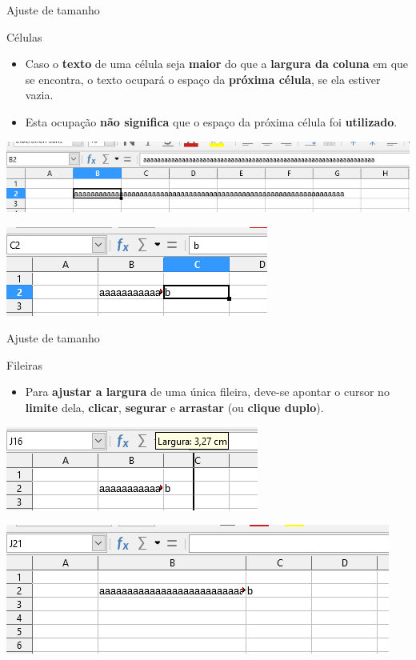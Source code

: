 \begin{frame}{Ajuste de tamanho}
	\begin{block}{Células}
		\begin{itemize}
			\item Caso o \textbf{texto} de uma célula seja \textbf{maior} do que a \textbf{largura da coluna} em que se encontra, o texto ocupará o espaço da \textbf{próxima célula}, se ela estiver vazia.
			\item Esta ocupação \textbf{não significa} que o espaço da próxima célula foi \textbf{utilizado}.
		\end{itemize}
	\end{block}
	
	\centering
	\includegraphics[width=0.7\linewidth]{Figuras/Ch06/fig19}
	
	\bigskip
	
	\includegraphics[width=0.5\linewidth]{Figuras/Ch06/fig20}
\end{frame}


\begin{frame}{Ajuste de tamanho}
	\begin{block}{Fileiras}
		\begin{itemize}
			\item Para \textbf{ajustar a largura} de uma única fileira, deve-se apontar o cursor no \textbf{limite} dela, \textbf{clicar}, \textbf{segurar} e \textbf{arrastar} (ou \textbf{clique duplo}).
		\end{itemize}
	\end{block}
	
	\centering
	\includegraphics[width=0.5\linewidth]{Figuras/Ch06/fig21}
	
	\bigskip
	
	\includegraphics[width=0.7\linewidth]{Figuras/Ch06/fig22}
\end{frame}


